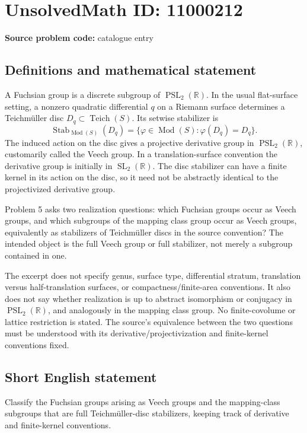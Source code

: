 \documentclass[11pt]{article}
\newcommand{\R}{\mathbb{R}}
\begin{document}
\section*{UnsolvedMath ID: 11000212}
\textbf{Source problem code:} catalogue entry
\subsection{Definitions and mathematical statement}
A Fuchsian group is a discrete subgroup of $\operatorname{PSL}_2(\R)$. In the usual flat-surface setting, a nonzero quadratic differential $q$ on a Riemann surface determines a Teichm\"uller disc $D_q\subset\operatorname{Teich}(S)$. Its setwise stabilizer is
\[
 \operatorname{Stab}_{\operatorname{Mod}(S)}(D_q)
 =\{\varphi\in\operatorname{Mod}(S):\varphi(D_q)=D_q\}.
\]
The induced action on the disc gives a projective derivative group in $\operatorname{PSL}_2(\R)$, customarily called the Veech group. In a translation-surface convention the derivative group is initially in $\operatorname{SL}_2(\R)$. The disc stabilizer can have a finite kernel in its action on the disc, so it need not be abstractly identical to the projectivized derivative group.

Problem 5 asks two realization questions: which Fuchsian groups occur as Veech groups, and which subgroups of the mapping class group occur as Veech groups, equivalently as stabilizers of Teichm\"uller discs in the source convention? The intended object is the full Veech group or full stabilizer, not merely a subgroup contained in one.

The excerpt does not specify genus, surface type, differential stratum, translation versus half-translation surfaces, or compactness/finite-area conventions. It also does not say whether realization is up to abstract isomorphism or conjugacy in $\operatorname{PSL}_2(\R)$, and analogously in the mapping class group. No finite-covolume or lattice restriction is stated. The source's equivalence between the two questions must be understood with its derivative/projectivization and finite-kernel conventions fixed.
\subsection{Short English statement}
Classify the Fuchsian groups arising as Veech groups and the mapping-class subgroups that are full Teichm\"uller-disc stabilizers, keeping track of derivative and finite-kernel conventions.
\end{document}
